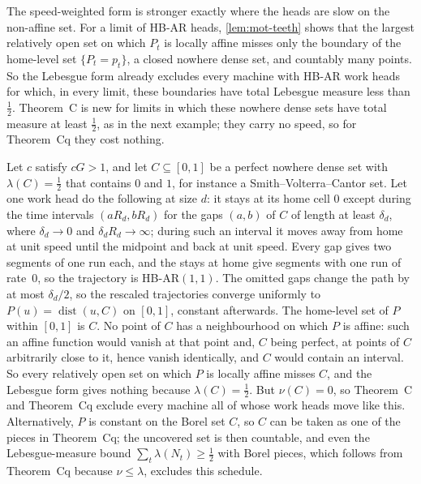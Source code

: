 The speed-weighted form is stronger exactly where the heads are slow on the non-affine set. For a limit of HB-AR heads,
\cref{lem:mot-teeth} shows that the largest relatively open set on which $P_t$ is locally affine misses only the
boundary of the home-level set $\{P_t=p_t\}$, a closed nowhere dense set, and countably many points. So the Lebesgue
form already excludes every machine with HB-AR work heads for which, in every limit, these boundaries have total
Lebesgue measure less than $\frac12$. Theorem~C is new for limits in which these nowhere dense sets have total measure at least $\frac12$, as
in the next example; they carry no speed, so for Theorem~Cq they cost nothing.

\begin{remark}\label{rem:mot-fatcantor}
Let $c$ satisfy $cG>1$, and let $C\subseteq[0,1]$ be a perfect nowhere dense set with $\lambda(C)=\frac12$ that
contains $0$ and $1$, for instance a Smith--Volterra--Cantor set. Let one work head do the following at size $d$: it stays at its home cell $0$
except during the time intervals $(aR_d,bR_d)$ for the gaps $(a,b)$ of $C$ of length at least $\delta_d$, where
$\delta_d\to0$ and $\delta_dR_d\to\infty$; during such an interval it moves away from home at unit speed until the
midpoint and back at unit speed. Every gap gives two segments of one run each, and the stays at home give segments with
one run of rate~$0$, so the trajectory is HB-AR$(1,1)$. The omitted gaps change the path by at most $\delta_d/2$, so the
rescaled trajectories converge uniformly to $P(u)=\operatorname{dist}(u,C)$ on $[0,1]$, constant afterwards. The
home-level set of $P$ within $[0,1]$ is $C$. No point of $C$ has a neighbourhood on which $P$ is affine: such an
affine function would vanish at that point and, $C$ being perfect, at points of $C$ arbitrarily close to it, hence
vanish identically, and $C$ would contain an interval. So every relatively open set on which $P$ is locally affine misses $C$, and the Lebesgue form gives nothing
because $\lambda(C)=\frac12$. But $\nu(C)=0$, so Theorem~C and Theorem~Cq exclude every machine all of whose work heads move
like this. Alternatively, $P$ is constant on the Borel set $C$, so $C$ can be taken as one of the pieces in Theorem~Cq;
the uncovered set is then countable, and even the Lebesgue-measure bound $\sum_t\lambda(N_t)\ge\frac12$ with Borel pieces,
which follows from Theorem~Cq because $\nu\le\lambda$, excludes this schedule.
\end{remark}

